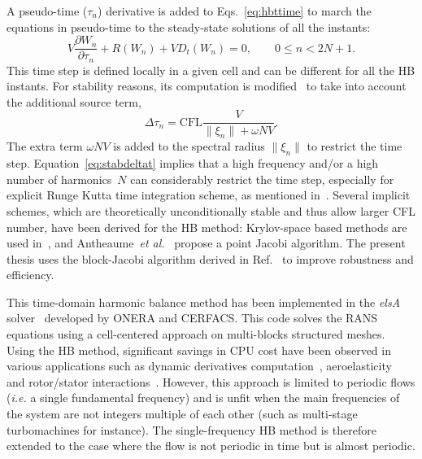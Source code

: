 A pseudo-time ($\tau_n$) derivative is added to
Eqs.~\eqref{eq:hbttime} to march the equations in pseudo-time to the
steady-state solutions of all the instants:
\begin{equation}
  \label{eq:pseudohbttime}
  V\frac{\partial W_n}{\partial\tau_n} + R(W_n)+VD_t(W_n)=0, \quad \quad
  0 \leq n < 2N+1.
\end{equation}
This time step is defined locally in a given cell and can
  be different for all the HB instants. For stability reasons, its
computation is modified~\cite{Weide2005} to take into account
the additional source term,
\begin{equation}
  \label{eq:stabdeltat}
  \Delta\tau_n=\text{CFL}\frac{V}{\|\xi_n\|+\omega NV}.
\end{equation}
The extra term $\omega NV$ is added to the spectral radius $\|\xi_n\|$ to
restrict the time step.  Equation~\eqref{eq:stabdeltat} implies that a
high frequency and/or a high number of harmonics~$N$ can considerably
restrict the time step, especially for explicit Runge Kutta time
integration scheme, as mentioned in~\cite{Hall2002}. %
Several implicit schemes, which are theoretically unconditionally stable and thus allow larger
CFL number, have been derived for the HB method: Krylov-space based
methods are used
in~\cite{FLD:FLD2111,woodgate09:_implic_harmon_balan_solver_for}, and
Antheaume~\emph{et
  al.}~\cite{antheaume11:_implic_time_spect_method_for} propose a
point Jacobi algorithm. The present thesis uses the block-Jacobi
algorithm derived in Ref.~\cite{Sicot2008} to improve robustness and
efficiency.

This time-domain harmonic balance method has been implemented in the
\emph{elsA} solver~\cite{cambier2012} developed by ONERA and
CERFACS. This code solves the RANS equations using a cell-centered
approach on multi-blocks structured meshes.  Using the HB method, significant savings in
CPU cost have been observed in various applications such as dynamic
derivatives computation~\cite{Hassan2011},
aeroelasticity~\cite{Dufour2010} and rotor/stator
interactions~\cite{Sicot2012}. However, this approach is limited to
periodic flows (\emph{i.e.} a single fundamental frequency) and is
unfit when the main frequencies of the system are not integers multiple
of each other (such as multi-stage turbomachines for instance). The single-frequency HB method is therefore
extended to the case where the flow is not periodic in time but is
almost periodic.

